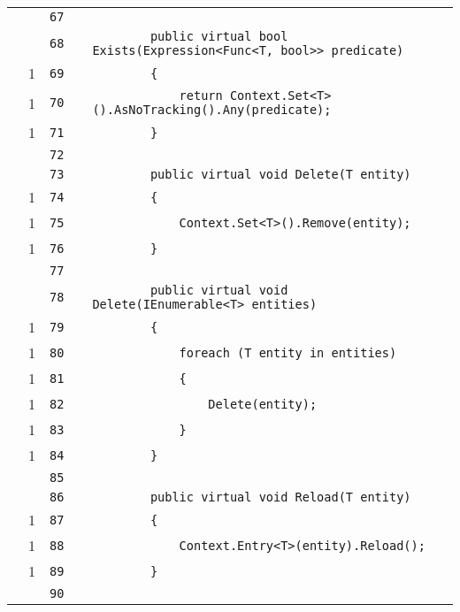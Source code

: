 \documentclass[a4paper,10pt]{article}
\begin{document}
\begin{longtable}[l]{lrrll}
\cellcolor{gray} &  & \verb~67~ & & \verb~~\\
\cellcolor{gray} &  & \verb~68~ & & \verb~        public virtual bool Exists(Expression<Func<T, bool>> predicate)~\\
\cellcolor{green} & 1 & \verb~69~ & & \verb~        {~\\
\cellcolor{green} & 1 & \verb~70~ & & \verb~            return Context.Set<T>().AsNoTracking().Any(predicate);~\\
\cellcolor{green} & 1 & \verb~71~ & & \verb~        }~\\
\cellcolor{gray} &  & \verb~72~ & & \verb~~\\
\cellcolor{gray} &  & \verb~73~ & & \verb~        public virtual void Delete(T entity)~\\
\cellcolor{green} & 1 & \verb~74~ & & \verb~        {~\\
\cellcolor{green} & 1 & \verb~75~ & & \verb~            Context.Set<T>().Remove(entity);~\\
\cellcolor{green} & 1 & \verb~76~ & & \verb~        }~\\
\cellcolor{gray} &  & \verb~77~ & & \verb~~\\
\cellcolor{gray} &  & \verb~78~ & & \verb~        public virtual void Delete(IEnumerable<T> entities)~\\
\cellcolor{green} & 1 & \verb~79~ & & \verb~        {~\\
\cellcolor{green} & 1 & \verb~80~ & & \verb~            foreach (T entity in entities)~\\
\cellcolor{green} & 1 & \verb~81~ & & \verb~            {~\\
\cellcolor{green} & 1 & \verb~82~ & & \verb~                Delete(entity);~\\
\cellcolor{green} & 1 & \verb~83~ & & \verb~            }~\\
\cellcolor{green} & 1 & \verb~84~ & & \verb~        }~\\
\cellcolor{gray} &  & \verb~85~ & & \verb~~\\
\cellcolor{gray} &  & \verb~86~ & & \verb~        public virtual void Reload(T entity)~\\
\cellcolor{green} & 1 & \verb~87~ & & \verb~        {~\\
\cellcolor{green} & 1 & \verb~88~ & & \verb~            Context.Entry<T>(entity).Reload();~\\
\cellcolor{green} & 1 & \verb~89~ & & \verb~        }~\\
\cellcolor{gray} &  & \verb~90~ & & \verb~~\\

\end{longtable}
\end{document}
